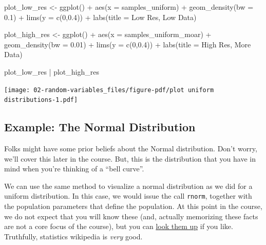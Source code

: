 \documentclass[
  letterpaper,
  DIV=11,
  numbers=noendperiod]{scrreprt}
\newenvironment{Shaded}{\begin{snugshade}}{\end{snugshade}}
\newcommand{\AttributeTok}[1]{\textcolor[rgb]{0.40,0.45,0.13}{#1}}
\newcommand{\DecValTok}[1]{\textcolor[rgb]{0.68,0.00,0.00}{#1}}
\newcommand{\FloatTok}[1]{\textcolor[rgb]{0.68,0.00,0.00}{#1}}
\newcommand{\FunctionTok}[1]{\textcolor[rgb]{0.28,0.35,0.67}{#1}}
\newcommand{\NormalTok}[1]{\textcolor[rgb]{0.00,0.23,0.31}{#1}}
\newcommand{\OtherTok}[1]{\textcolor[rgb]{0.00,0.23,0.31}{#1}}
\newcommand{\SpecialCharTok}[1]{\textcolor[rgb]{0.37,0.37,0.37}{#1}}
\newcommand{\StringTok}[1]{\textcolor[rgb]{0.13,0.47,0.30}{#1}}
\begin{document}
\begin{Shaded}
\begin{Highlighting}[]
\NormalTok{plot\_low\_res }\OtherTok{\textless{}{-}} \FunctionTok{ggplot}\NormalTok{()   }\SpecialCharTok{+} 
  \FunctionTok{aes}\NormalTok{(}\AttributeTok{x =}\NormalTok{ samples\_uniform) }\SpecialCharTok{+} 
  \FunctionTok{geom\_density}\NormalTok{(}\AttributeTok{bw =} \FloatTok{0.1}\NormalTok{)   }\SpecialCharTok{+} 
  \FunctionTok{lims}\NormalTok{(}\AttributeTok{y =} \FunctionTok{c}\NormalTok{(}\DecValTok{0}\NormalTok{,}\FloatTok{0.4}\NormalTok{))       }\SpecialCharTok{+} 
  \FunctionTok{labs}\NormalTok{(}\AttributeTok{title =} \StringTok{\textquotesingle{}Low Res, Low Data\textquotesingle{}}\NormalTok{)}

\NormalTok{plot\_high\_res }\OtherTok{\textless{}{-}} \FunctionTok{ggplot}\NormalTok{()       }\SpecialCharTok{+} 
  \FunctionTok{aes}\NormalTok{(}\AttributeTok{x =}\NormalTok{ samples\_uniform\_moar) }\SpecialCharTok{+} 
  \FunctionTok{geom\_density}\NormalTok{(}\AttributeTok{bw =} \FloatTok{0.01}\NormalTok{)       }\SpecialCharTok{+} 
  \FunctionTok{lims}\NormalTok{(}\AttributeTok{y =} \FunctionTok{c}\NormalTok{(}\DecValTok{0}\NormalTok{,}\FloatTok{0.4}\NormalTok{))            }\SpecialCharTok{+} 
  \FunctionTok{labs}\NormalTok{(}\AttributeTok{title =} \StringTok{\textquotesingle{}High Res, More Data\textquotesingle{}}\NormalTok{)}

\NormalTok{plot\_low\_res }\SpecialCharTok{|}\NormalTok{ plot\_high\_res}
\end{Highlighting}
\end{Shaded}

\texttt{[image: 02-random-variables\_files/figure-pdf/plot uniform distributions-1.pdf]}

\subsection{Example: The Normal
Distribution}\label{example-the-normal-distribution}

Folks might have some prior beliefs about the Normal distribution. Don't
worry, we'll cover this later in the course. But, this is the
distribution that you have in mind when you're thinking of a ``bell
curve''.

We can use the same method to visualize a normal distribution as we did
for a uniform distribution. In this case, we would issue the call
\texttt{rnorm}, together with the population parameters that define the
population. At this point in the course, we do not expect that you will
know these (and, actually memorizing these facts are not a core focus of
the course), but you can
\href{https://en.wikipedia.org/wiki/Normal_distribution}{look them up}
if you like. Truthfully, statistics wikipedia is \emph{very} good.
\end{document}
